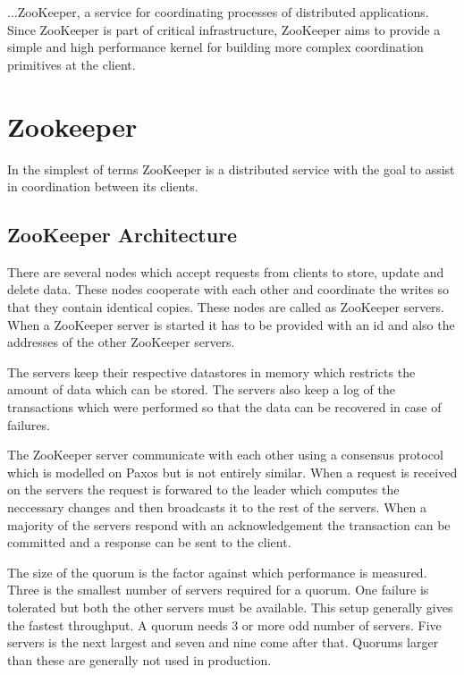 \begin{savequote}[100mm]
...ZooKeeper, a service for coordinating processes of distributed applications. Since ZooKeeper is part of critical infrastructure, ZooKeeper aims to provide a simple and high performance kernel for building more complex coordination primitives at the client.
\end{savequote}

\chapter{Zookeeper}
In the simplest of terms ZooKeeper is a distributed service with the goal to assist in coordination between its clients.
\section{ZooKeeper Architecture}

There are several nodes which accept requests from clients to store, update and delete data. These nodes cooperate with each other and coordinate the writes so that they contain identical copies. These nodes are called as ZooKeeper servers. When a ZooKeeper server is started it has to be provided with an id and also the addresses of the other ZooKeeper servers. 

The servers keep their respective datastores in memory which restricts the amount of data which can be stored. The servers also keep a log of the transactions which were performed so that the data can be recovered in case of failures.



The ZooKeeper server communicate with each other using a consensus protocol which is modelled on Paxos but is not entirely similar. When a request is received on the servers the request is forwared to the leader which computes the neccessary changes and then broadcasts it to the rest of the servers. When a majority of the servers respond with an acknowledgement the transaction can be committed and a response can be sent to the client. 

The size of the quorum is the factor against which performance is measured. Three is the smallest number of servers required for a quorum. One failure is tolerated but both the other servers must be available. This setup generally gives the fastest throughput. A quorum needs 3 or more odd number of servers. Five servers is the next largest and seven and nine come after that. Quorums larger than these are generally not used in production.

